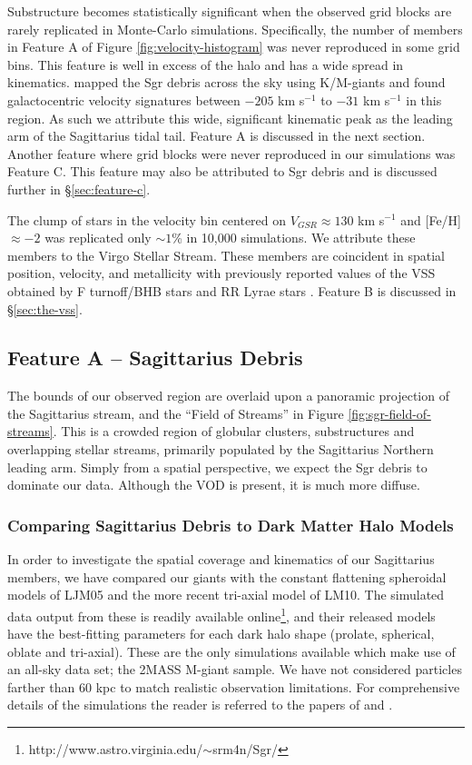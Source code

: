 \documentclass[preprint2]{aastex}
\begin{document}
	 Substructure becomes statistically significant when the observed grid blocks are rarely replicated in Monte-Carlo simulations. Specifically, the number of members in Feature A of Figure \ref{fig:velocity-histogram} was never reproduced in some grid bins. This feature is well in excess of the halo and has a wide spread in kinematics. \citet{Chou;et-al_2007} mapped the Sgr debris across the sky using K/M-giants and found galactocentric velocity signatures between $-205$ km s$^{-1}$ to $-31$ km s$^{-1}$ in this region. As such we attribute this wide, significant kinematic peak as the leading arm of the Sagittarius tidal tail. Feature A is discussed in the next section. Another feature where grid blocks were never reproduced in our simulations was Feature C. This feature may also be attributed to Sgr debris and is discussed further in \S\ref{sec:feature-c}.
	 	
	 The clump of stars in the velocity bin centered on $V_{GSR} \approx 130$ km s$^{-1}$ and [Fe/H] $\approx -2$ was replicated only $\sim1$\% in 10,000 simulations. We attribute these members to the Virgo Stellar Stream. These members are coincident in spatial position, velocity, and metallicity with previously reported values of the VSS obtained by F turnoff/BHB stars \citep{Newberg;et-al_2007} and RR Lyrae stars \citep{Prior;et-al_2009a}. Feature B is discussed in \S\ref{sec:the-vss}.


	\subsection{Feature A \--- Sagittarius Debris}
	\label{sec:sgr-debris}
	
	The bounds of our observed region are overlaid upon a panoramic projection of the Sagittarius stream, and the  ``Field of Streams''  \citep{Belokurov;et-al_2006} in Figure \ref{fig:sgr-field-of-streams}. This is a crowded region of globular clusters, substructures and overlapping stellar streams, primarily populated by the Sagittarius Northern leading arm. Simply from a spatial perspective, we expect the Sgr debris to dominate our data. Although the VOD is present, it is much more diffuse. 
	
	\subsubsection{Comparing Sagittarius Debris to Dark Matter Halo Models}	

	In order to investigate the spatial coverage and kinematics of our Sagittarius members, we have compared our giants with the constant flattening spheroidal models of LJM05 and the more recent tri-axial model of LM10. The simulated data output from these is readily available online\footnote{http://www.astro.virginia.edu/$\sim$srm4n/Sgr/}, and their released models have the best-fitting parameters for each dark halo shape (prolate, spherical, oblate and tri-axial).  These are the only simulations available which make use of an all-sky data set; the 2MASS M-giant sample. We have not considered particles farther than 60 kpc to match realistic observation limitations. For comprehensive details of the simulations the reader is referred to the papers of \citet{Law;et-al_2005} and \citet{Law;Majewski_2010}. 
		
\end{document}
